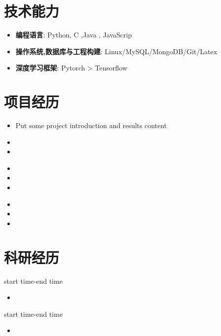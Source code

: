 \documentclass{resume}
\begin{document}
\section{\faCogs 技术能力}
\begin{itemize}[parsep=0.2ex]
  \item \textbf{编程语言}: Python, C ,Java , JavaScrip
  \item \textbf{操作系统,数据库与工程构建}: Linux/MySQL/MongoDB/Git/Latex
  \item \textbf{深度学习框架}: Pytorch > Tensorflow
\end{itemize}


\section{ \faObjectGroup 项目经历}
\begin{itemize}
  \item Put some project introduction and results content
  \item 
  \item 
\end{itemize}

\begin{itemize}
  \item 
  \item 
  \item 
\end{itemize}

\begin{itemize}
  \item 
  \item 
  \item 
\end{itemize}

\section{\faNeuter 科研经历}
 {start time-end time}
\begin{itemize}
  \item 
\end{itemize}
 {start time-end time}
\begin{itemize}
  \item 
\end{itemize}
\end{document}
